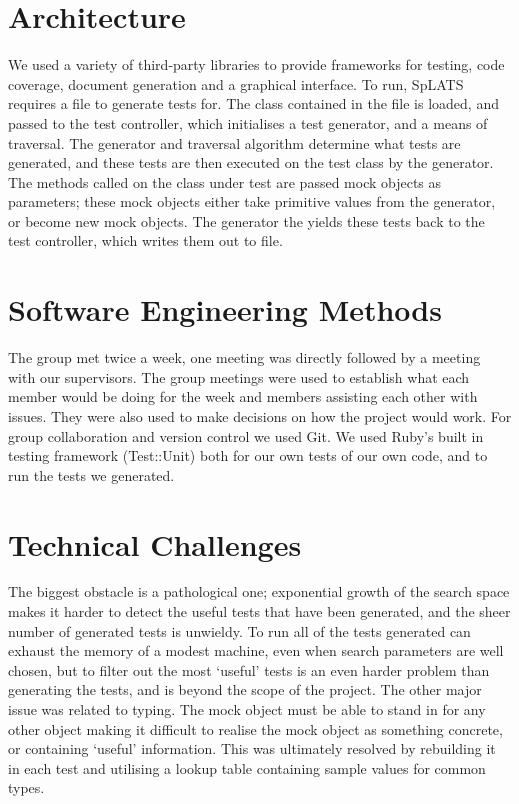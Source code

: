 \documentclass{article}
\begin{document}
\section{Architecture}
We used a variety of third-party libraries to provide frameworks for testing, code coverage, document generation and a graphical interface.
To run, SpLATS requires a file to generate tests for. The class contained in the file is loaded, and passed to the test controller, which initialises a test generator, and a means of traversal. The generator and traversal algorithm determine what tests are generated, and these tests are then executed on the test class by the generator. The methods called on the class under test are passed mock objects as parameters; these mock objects either take primitive values from the generator, or become new mock objects. The generator the yields these tests back to the test controller, which writes them out to file.

\section{Software Engineering Methods}
The group met twice a week, one meeting was directly followed by a meeting with our supervisors. The group meetings were used to establish what each member would be doing for the week and members assisting each other with issues. They were also used to make decisions on how the project would work.
For group collaboration and version control we used Git. We used Ruby’s built in testing framework (Test::Unit) both for our own tests of our own code, and to run the tests we generated.

\section{Technical Challenges}
The biggest obstacle is a pathological one; exponential growth of the search space makes it harder to detect the useful tests that have been generated, and the sheer number of generated tests is unwieldy. To run all of the tests generated can exhaust the memory of a modest machine, even when search parameters are well chosen, but to filter out the most ‘useful’ tests is an even harder problem than generating the tests, and is beyond the scope of the project.
The other major issue was related to typing. The mock object must be able to stand in for any other object making it difficult to realise the mock object as something concrete, or containing ‘useful’ information. This was ultimately resolved by rebuilding it in each test and utilising a lookup table containing sample values for common types.
\end{document}
